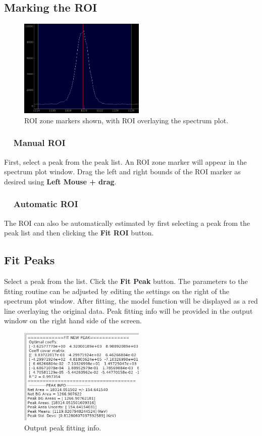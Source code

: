 \documentclass[10pt]{article}
\begin{document}
\subsection*{Marking the ROI}
\begin{figure}[!htbp]
\centering
\includegraphics[width=6cm]{images/roi_ex.png}
\caption{ROI zone markers shown, with ROI overlaying the spectrum plot.}
\label{roi_ex}
\end{figure}

\subsubsection*{\ \ Manual ROI}
First, select a peak from the peak list.  An ROI zone marker will appear in the spectrum plot window.
Drag the left and right bounds of the ROI marker as desired using \textbf{Left Mouse + drag}.

\subsubsection*{\ \ Automatic ROI}
The ROI can also be automatically estimated by first selecting a peak from the peak list
and then clicking the \textbf{Fit ROI} button.

\subsection*{Fit Peaks}

Select a peak from the list.  Click the \textbf{Fit Peak} button.  The parameters to
the fitting routine can be adjusted by editing the settings on the right of the spectrum plot window.
After fitting, the model function will be displayed as a red line overlaying the original data.
Peak fitting info will be provided in the output window on the right hand side of the screen.
\begin{figure}[!htbp]
\centering
\includegraphics[width=6cm]{images/peak_out_ex.png}
\caption{Output peak fitting info.}
\label{output}
\end{figure}
\end{document}
